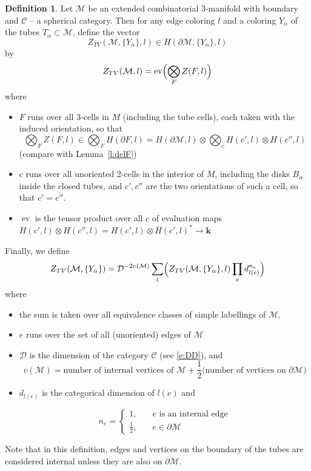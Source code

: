 \documentclass{amsart}
\theoremstyle{definition}
\newtheorem{definition}[theorem]{Definition}
\theoremstyle{remark}
\numberwithin{equation}{section}
\newcommand{\leref}[1]{Lemma~{\rm\ref{#1}}}
\newcommand{\ov}{\overline}
\newcommand{\del}{\partial}
\newcommand{\<}{\langle}
\renewcommand{\>}{\rangle}
\newcommand{\kk}{\mathbf{k}}       %
\newcommand{\DD}{\mathcal{D}}      %
\newcommand{\C}{\mathcal{C}}      %
\newcommand{\M}{\mathcal{M}}      %
\newcommand{\al}{\alpha}
\DeclareMathOperator{\ev}{ev} %
\begin{document}
\begin{definition}\label{d:TV_invariant_ex}
  Let $\M$ be an extended combinatorial 3-manifold with boundary and $\C$
-- a  spherical category. Then for any edge coloring $l$ and a
coloring $Y_\al$ of the tubes $T_\al\subset \M$, define the vector
$$
Z_{TV}(\M, \{Y_\al\}, l)\in  H(\del \M,\{Y_\al\},l)
$$
by 
$$
Z_{TV}(\M,l)=\ev\Bigl(\bigotimes_F Z(F,l)\Bigr)
$$
where 
\begin{itemize}
    \item $F$ runs over all 3-cells in $M$ (including the tube cells),  
    each taken with the induced orientation, so that  
    $$
      \bigotimes_F Z(F,l)\in \bigotimes_F H(\del F,l)=H(\del
\M,l)\otimes
      \bigotimes_{c}  H(c',l)\otimes H(c'',l)
    $$
    (compare with \leref{l:delF})  

  \item $c$ runs over all unoriented 2-cells in
    the interior of   $M$, including the disks $B_\al$ inside the closed
     tubes, and $c', c''$ are the two orientations of such a
    cell, so that   $c'=\ov{c''}$. 
  \item $\ev$ is the tensor product over all $c$ of evaluation maps
    $H(c',l)\otimes  H(c'',l)=H(c',l)\otimes H(c',l)^*\to \kk$
\end{itemize}


Finally, we define
\begin{equation}\label{e:Z_ext}
Z_{TV}(\M,\{Y_\al\})=\DD^{-2v(\M)}\sum_{l} \Bigl(
Z_{TV}(\M,\{Y_\al\},l)\prod_{e}d^{n_e}_{l(e)}\Bigr)
\end{equation}
where 
\begin{itemize}
\item the sum is taken over all equivalence classes of 
   simple labellings of $\M$,
\item $e$ runs over the set of all (unoriented) edges of $\M$
\item $\DD$ is the dimension of the category $\C$ (see \eqref{e:DD}), and
  $$
  v(\M)=\text{number of internal vertices of } \M+
   \frac{1}{2}\text{(number of vertices on }\del \M)
$$
\item $d_{l(e)}$ is the categorical dimension of $l(e)$ and 

$$n_e=\begin{cases}1, &\quad e \text{ is an internal edge}\\
                   \tfrac{1}{2}, &\quad e \in \del \M
                   \end{cases}
$$
\end{itemize}
\end{definition}
Note that in this definition, edges and vertices on the boundary of the
tubes are considered internal unless they are also on $\del \M$. 
\end{document}
